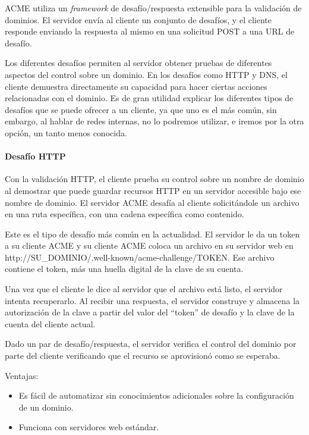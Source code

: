 ACME utiliza un \emph{framework} de desafío/respuesta extensible para la validación 
de dominios. El servidor envía al cliente un conjunto de desafíos, y el cliente 
responde enviando la respuesta al mismo en una solicitud POST a una URL de desafío.

Los diferentes desafíos permiten al servidor obtener pruebas de diferentes 
aspectos del control sobre un dominio. En los desafíos como HTTP y 
DNS, el cliente demuestra directamente su capacidad para hacer ciertas 
acciones relacionadas con el dominio. Es de gran utilidad explicar los 
diferentes tipos de desafíos que se puede ofrecer a un cliente, ya que uno 
es el más común, sin embargo, al hablar de redes internas, no lo podremos 
utilizar, e iremos por la otra opción, un tanto menos conocida.


\paragraph*{Desafío HTTP}

Con la validación HTTP, el cliente prueba su control sobre un nombre de dominio al 
demostrar que puede guardar recursos HTTP en un servidor accesible bajo ese nombre 
de dominio. El servidor ACME desafía al cliente solicitándole un archivo en una ruta 
específica, con una cadena específica como contenido.

Este es el tipo de desafío más común en la actualidad. El servidor le da un token 
a su cliente ACME y su cliente ACME coloca un archivo en su servidor web 
en {http://\<SU\_DOMINIO\>/.well-known/acme-challenge/\<TOKEN\>}. Ese archivo contiene 
el token, más una huella digital de la clave de su cuenta.

Una vez que el cliente le dice al servidor que el archivo está listo, el servidor 
intenta recuperarlo. Al recibir una respuesta, el servidor construye y almacena la 
autorización de la clave a partir del valor del “token” de desafío y la clave de 
la cuenta del cliente actual.

Dado un par de desafío/respuesta, el servidor verifica el control del dominio por 
parte del cliente verificando que el recurso se aprovisionó como se esperaba.

Ventajas:
\begin{itemize}
   \setlength\itemsep{-0.6em}
   \item Es fácil de automatizar sin conocimientos adicionales sobre la configuración de un dominio.
   \item Funciona con servidores web estándar.
\end{itemize}

